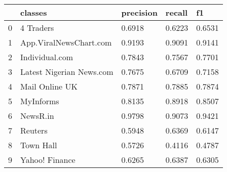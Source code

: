 \begin{tabular}{lllll}
\toprule
{} &                   classes & precision &  recall &      f1 \\
\midrule
0 &                 4 Traders &    0.6918 &  0.6223 &  0.6531 \\
1 &    App.ViralNewsChart.com &    0.9193 &  0.9091 &  0.9141 \\
2 &            Individual.com &    0.7843 &  0.7567 &  0.7701 \\
3 &  Latest Nigerian News.com &    0.7675 &  0.6709 &  0.7158 \\
4 &            Mail Online UK &    0.7871 &  0.7885 &  0.7874 \\
5 &                 MyInforms &    0.8135 &  0.8918 &  0.8507 \\
6 &                  NewsR.in &    0.9798 &  0.9073 &  0.9421 \\
7 &                   Reuters &    0.5948 &  0.6369 &  0.6147 \\
8 &                 Town Hall &    0.5726 &  0.4116 &  0.4787 \\
9 &            Yahoo! Finance &    0.6265 &  0.6387 &  0.6305 \\
\bottomrule
\end{tabular}
